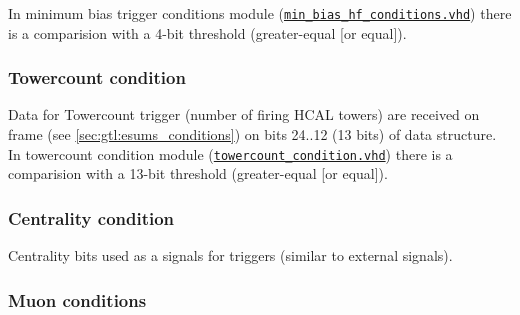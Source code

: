 In minimum bias trigger conditions module (\href{https://github.com/cms-l1-globaltrigger/mp7_ugt_legacy/tree/master/firmware/hdl/gt_mp7_core/gtl_fdl_wrapper/gtl/min_bias_hf_conditions.vhd}{\texttt{min\_bias\_hf\_conditions.vhd}}) there is a comparision with a 4-bit threshold (greater-equal [or equal]).

\subsubsection{Towercount condition}
\label{sec:gtl:towercount_cond}

Data for Towercount trigger (number of firing HCAL towers) are received on frame \htt (see \ref{sec:gtl:esums_conditions}) on bits 24..12 (13 bits) of \htt data structure.\\ 
In towercount condition module (\href{https://github.com/cms-l1-globaltrigger/mp7_ugt_legacy/tree/master/firmware/hdl/gt_mp7_core/gtl_fdl_wrapper/gtl/towercount\_condition.vhd}{\texttt{towercount\_condition.vhd}}) there is a comparision with a 13-bit threshold (greater-equal [or equal]).

\subsubsection{Centrality condition}
\label{sec:gtl:centrality_cond}

Centrality bits used as a signals for triggers (similar to external signals).

\subsubsection{Muon conditions}
\label{sec:gtl:muon_conditions}

